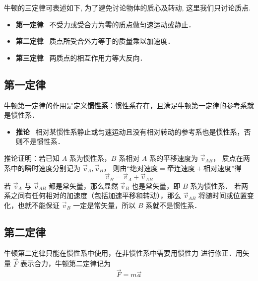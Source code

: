 
牛顿的三定律可表述如下, 为了避免讨论物体的质心及转动, 这里我们只讨论质点.
\begin{itemize}
\item \textbf{第一定律} \ 不受力或受合力为零的质点做匀速运动或静止．
\item \textbf{第二定律} \ 质点所受合外力等于的质量乘以加速度．
\item \textbf{第三定律} \ 两质点的相互作用力等大反向．
\end{itemize}

\subsection{第一定律}

牛顿第一定律的作用是定义\textbf{惯性系}：惯性系存在，且满足牛顿第一定律的参考系就是惯性系．

\begin{itemize}
\item \textbf{推论} \ 相对某惯性系静止或匀速运动且没有相对转动的参考系也是惯性系，否则不是惯性系．
\end{itemize}

推论证明：若已知 $A$ 系为惯性系，$B$ 系相对 $A$ 系的平移速度为 $\vec v_{AB}$， 质点在两系中的瞬时速度分别记为 $\vec v_A, \vec v_B$， 则由“$\text{绝对速度} = \text{牵连速度} + \text{相对速度}$”得
\begin{equation}
\vec v_{B} = \vec v_{A} + \vec v_{AB}
\end{equation}
若 $\vec v_{A}$ 与 $\vec v_{AB}$ 都是常矢量，那么显然 $\vec v_{B}$ 也是常矢量，即 $B$ 系为惯性系． 若两系之间有任何相对的加速度（包括加速平移和转动），那么 $\vec v_{AB}$ 将随时间或位置变化，也就不能保证 $\vec v_B$ 一定是常矢量，所以 $B$ 系就不是惯性系．


\subsection{第二定律}
牛顿第二定律只能在惯性系中使用，在非惯性系中需要用惯性力 进行修正．用矢量 $\vec F$ 表示合力，牛顿第二定律记为
\begin{equation}\label{New3_eq1}
\vec F = m\vec a
\end{equation}

